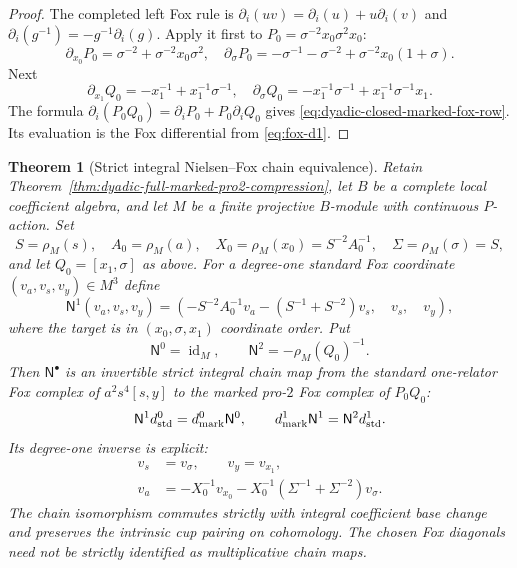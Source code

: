 \documentclass[11pt]{article}
\newtheorem{theorem}{Theorem}[section]
\theoremstyle{definition}
\begin{document}
\begin{proof}
The completed left Fox rule is
$\partial_i(uv)=\partial_i(u)+u\partial_i(v)$
and
$\partial_i(g^{-1})=-g^{-1}\partial_i(g)$.
Apply it first to
$P_0=\sigma^{-2}x_0\sigma^2x_0$:
\[
\partial_{x_0}P_0
 =\sigma^{-2}+\sigma^{-2}x_0\sigma^2,
\quad
\partial_\sigma P_0
 =-\sigma^{-1}-\sigma^{-2}
    +\sigma^{-2}x_0(1+\sigma).
\]
Next
\[
\partial_{x_1}Q_0
 =-x_1^{-1}+x_1^{-1}\sigma^{-1},
\quad
\partial_{\sigma}Q_0
 =-x_1^{-1}\sigma^{-1}
     +x_1^{-1}\sigma^{-1}x_1.
\]
The formula $\partial_i(P_0Q_0)
=\partial_iP_0+P_0\partial_iQ_0$
gives
\eqref{eq:dyadic-closed-marked-fox-row}.
Its evaluation is the Fox differential
from \eqref{eq:fox-d1}.
\end{proof}

\begin{theorem}[Strict integral Nielsen--Fox chain equivalence]
\label{thm:dyadic-strict-nielsen-fox-chain}
Retain Theorem~\ref{thm:dyadic-full-marked-pro2-compression},
let $B$ be a complete local coefficient algebra,
and let $M$ be a finite projective $B$-module
with continuous $P$-action.
Set
\[
S=\rho_M(s),\quad A_0=\rho_M(a),\quad
X_0=\rho_M(x_0)=S^{-2}A_0^{-1},
\quad
\Sigma=\rho_M(\sigma)=S,
\]
and let $Q_0=[x_1,\sigma]$ as above.
For a degree-one standard Fox coordinate
$(v_a,v_s,v_y)\in M^3$ define
\begin{equation}\label{eq:dyadic-strict-nielsen-s1}
\mathsf N^1(v_a,v_s,v_y)=
\left(
 -S^{-2}A_0^{-1}v_a
 -(S^{-1}+S^{-2})v_s,\quad
 v_s,\quad v_y
\right),
\end{equation}
where the target is in $(x_0,\sigma,x_1)$
coordinate order.  Put
\begin{equation}\label{eq:dyadic-strict-nielsen-s2}
\mathsf N^0=\operatorname{id}_M,\qquad
\mathsf N^2=-\rho_M(Q_0)^{-1}.
\end{equation}
Then $\mathsf N^\bullet$ is an \emph{invertible
strict integral chain map} from the
standard one-relator Fox complex of
$a^2s^4[s,y]$ to the marked pro-$2$
Fox complex of $P_0Q_0$:
\begin{equation}\label{eq:dyadic-strict-nielsen-chain-square}
\mathsf N^1 d_{\rm std}^0
=d_{\rm mark}^0\mathsf N^0,
\qquad
d_{\rm mark}^1\mathsf N^1
=\mathsf N^2d_{\rm std}^1.
\end{equation}
Its degree-one inverse is explicit:
\begin{equation}\label{eq:dyadic-strict-nielsen-inverse}
\begin{aligned}
v_s&=v_\sigma,\qquad v_y=v_{x_1},\\
v_a&=-X_0^{-1}v_{x_0}
     -X_0^{-1}(\Sigma^{-1}+\Sigma^{-2})v_\sigma.
\end{aligned}
\end{equation}
The chain isomorphism commutes strictly with
integral coefficient base change and
preserves the intrinsic cup pairing
on cohomology.  The chosen Fox diagonals
need not be strictly identified as
multiplicative chain maps.
\end{theorem}
\end{document}
